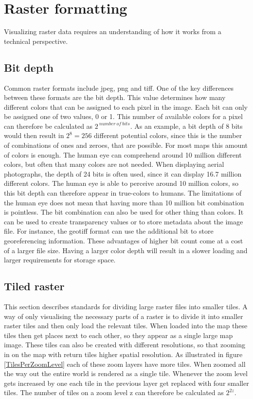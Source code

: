 \chapter{Raster formatting}

Visualizing raster data requires an understanding of how it works from a technical perspective.

\section{Bit depth} 
Common raster formats include jpeg, png and tiff. One of the key differences between these formats are the bit depth. This value determines how many different colors that can be assigned to each pixel in the image. Each bit can only be assigned one of two values, 0 or 1. This number of available colors for a pixel can therefore be calculated as $2^{\:number\: of\: bits}$. As an example, a bit depth of 8 bits would then result in $2^8 = 256$ different potential colors, since this is the number of combinations of ones and zeroes, that are possible. For most maps this amount of colors is enough. The human eye can comprehend around 10 million different colors, but often that many colors are not needed. When displaying aerial photographs, the depth of 24 bits is often used, since it can display 16.7 million different colors. The human eye is able to perceive around 10 million colors, so this bit depth can therefore appear in true-colors to humans.
The limitations of the human eye does not mean that having more than 10 million bit combination is pointless. The bit combination can also be used for other thing than colors. It can be used to create transparency values or to store metadata about the image file. For instance, the geotiff format can use the additional bit to store georeferencing information.
These advantages of higher bit count come at a cost of a larger file size. Having a larger color depth will result in a slower loading and larger requirements for storage space. \citep{Dent} %

\section{Tiled raster}
This section describes standards for dividing large raster files into smaller tiles. 
A way of only visualising the necessary parts of a raster is to divide it into smaller raster tiles and then only load the relevant tiles. When loaded into the map these tiles then get places next to each other, so they appear as a single large map image. These tiles can also be created with different resolutions, so that zooming in on the map with return tiles higher spatial resolution.  As illustrated in figure \ref{TilesPerZoomLevel} each of these zoom layers have more tiles.
\citep{Liedman}
When zoomed all the way out the entire world is rendered as a single tile. Whenever the zoom level gets increased by one each tile in the previous layer get replaced with four smaller tiles. The number of tiles on a zoom level z can therefore be calculated as $2^{2z}$.
\citep{SlippyMap}

